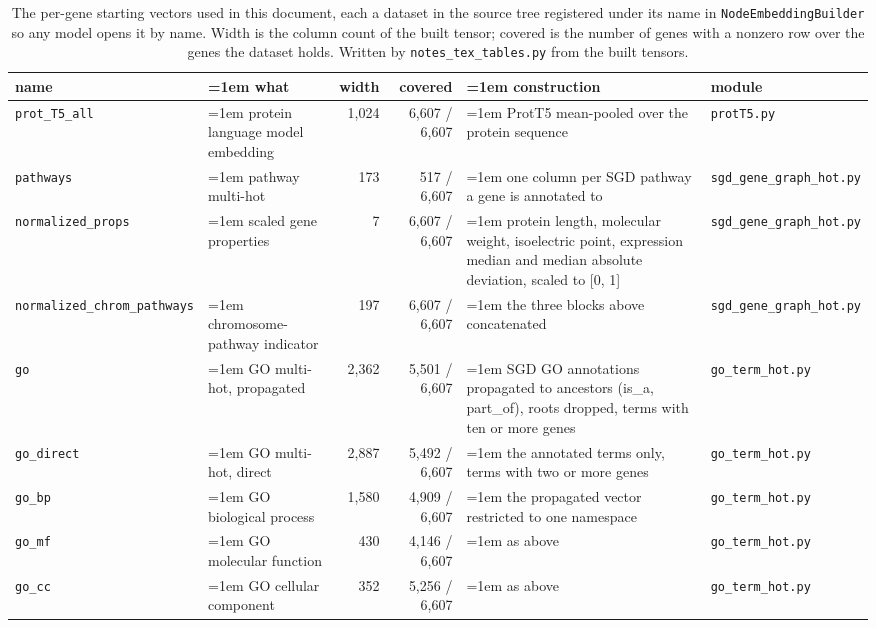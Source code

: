 \begin{table}[H]
  \centering
  \scriptsize
  \setlength{\tabcolsep}{2.5pt}
  \caption[Gene starting vectors as datasets]{The per-gene starting vectors used in this document, each a dataset in the source tree registered under its name in \texttt{NodeEmbeddingBuilder} so any model opens it by name. Width is the column count of the built tensor; covered is the number of genes with a nonzero row over the genes the dataset holds. Written by \texttt{notes\_tex\_tables.py} from the built tensors.}
  \label{tab:gene-encodings}
  \begin{tabular}{@{}l>{\raggedright\hangindent=1em\hangafter=1\arraybackslash}p{43.8mm}rr>{\raggedright\hangindent=1em\hangafter=1\arraybackslash}p{44.3mm}l@{}}
    \hline
    name & what & width & covered & construction & module \\
    \hline
    \texttt{prot\_T5\_all} & protein language model embedding & 1,024 & 6,607 / 6,607 & ProtT5 mean-pooled over the protein sequence & \texttt{protT5.py} \\
    \texttt{pathways} & pathway multi-hot & 173 & 517 / 6,607 & one column per SGD pathway a gene is annotated to & \texttt{sgd\_gene\_graph\_hot.py} \\
    \texttt{normalized\_props} & scaled gene properties & 7 & 6,607 / 6,607 & protein length, molecular weight, isoelectric point, expression median and median absolute deviation, scaled to [0, 1] & \texttt{sgd\_gene\_graph\_hot.py} \\
    \texttt{normalized\_chrom\_pathways} & chromosome-pathway indicator & 197 & 6,607 / 6,607 & the three blocks above concatenated & \texttt{sgd\_gene\_graph\_hot.py} \\
    \texttt{go} & GO multi-hot, propagated & 2,362 & 5,501 / 6,607 & SGD GO annotations propagated to ancestors (is\_a, part\_of), roots dropped, terms with ten or more genes & \texttt{go\_term\_hot.py} \\
    \texttt{go\_direct} & GO multi-hot, direct & 2,887 & 5,492 / 6,607 & the annotated terms only, terms with two or more genes & \texttt{go\_term\_hot.py} \\
    \texttt{go\_bp} & GO biological process & 1,580 & 4,909 / 6,607 & the propagated vector restricted to one namespace & \texttt{go\_term\_hot.py} \\
    \texttt{go\_mf} & GO molecular function & 430 & 4,146 / 6,607 & as above & \texttt{go\_term\_hot.py} \\
    \texttt{go\_cc} & GO cellular component & 352 & 5,256 / 6,607 & as above & \texttt{go\_term\_hot.py} \\
    \hline
  \end{tabular}
\end{table}
